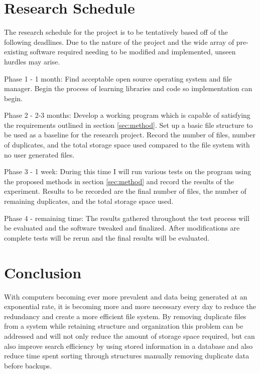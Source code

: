 \documentclass[11pt]{article}
\begin{document}
\section{Research Schedule}
\label{sec:schedule}
\vspace*{-.1in}

The research schedule for the project is to be tentatively based off of the following deadlines. Due to the nature of the project and the wide array of pre-existing software required needing to be modified and implemented, unseen hurdles may arise. 

Phase 1 - 1 month: Find acceptable open source operating system and file manager. Begin the process of learning libraries and code so implementation can begin.

Phase 2 - 2-3 months: Develop a working program which is capable of satisfying the requirements outlined in section \ref{sec:method}. Set up a basic file structure to be used as a baseline for the research project. Record the number of files, number of duplicates, and the total storage space used compared to the file system with no user generated files.

Phase 3 - 1 week: During this time I will run various tests on the program using the proposed methods in section \ref{sec:method} and record the results of the experiment. Results to be recorded are the final number of files, the number of remaining duplicates, and the total storage space used.

Phase 4 - remaining time: The results gathered throughout the test process will be evaluated and the software tweaked and finalized. After modifications are complete tests will be rerun and the final results will be evaluated.

\vspace*{-.1in}
\section{Conclusion}
\label{sec:conclusion}
\vspace*{-.1in}

With computers becoming ever more prevalent and data being generated at an exponential rate, it is becoming more and more necessary every day to reduce the redundancy and create a more efficient file system. By removing duplicate files from a system while retaining structure and organization this problem can be addressed and will not only reduce the amount of storage space required, but can also improve search efficiency by using stored information in a database and also reduce time spent sorting through structures manually removing duplicate data before backups.



\end{document}
